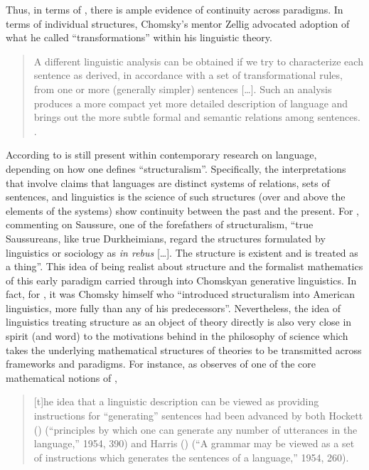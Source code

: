\documentclass[output=paper]{langscibook}
\begin{document}
Thus, in terms of , there is ample evidence of continuity across paradigms. In terms of individual structures, Chomsky's mentor Zellig \cite{Harris1951} advocated adoption of what he called ``transformations'' within his  linguistic theory. 

\begin{quote}
    A different linguistic analysis can be obtained if we try to characterize each sentence as derived, in accordance with a set of transformational rules, from one or more (generally simpler) sentences […]. Such an analysis produces a more compact yet more detailed description of language and brings out the more subtle formal and semantic relations among sentences. \citep[iv]{Harris1951}.
\end{quote}

According to \cite{Matthews2001}  is still present within contemporary research on language, depending on how one defines ``structuralism''. Specifically, the interpretations that involve claims that languages are distinct systems of relations, sets of sentences, and linguistics is the science of such structures (over and above the elements of the systems) show continuity between the past and the present. For \cite[181]{Firth1957}, commenting on Saussure, one of the forefathers of structuralism,  ``true Saussureans, like true Durkheimians, regard the structures formulated by linguistics or sociology as \emph{in rebus} […]. The structure is existent and is treated as a thing''. This idea of being realist about structure and the formalist mathematics of this early paradigm carried through into Chomskyan generative linguistics. In fact, for \cite[26]{Joseph1999}, it was Chomsky himself who ``introduced structuralism into American linguistics, more fully than any of his predecessors''. Nevertheless, the idea of linguistics treating structure as an object of theory directly is also very close in spirit (and word) to the motivations behind  in the philosophy of science which takes the underlying mathematical structures of theories to be transmitted across frameworks and paradigms. For instance, as \cite{Pullum2019} observes of one of the core mathematical notions of , 

\begin{quote}
    [t]he idea that a linguistic description can be viewed as providing instructions for ``generating'' sentences had been advanced by both Hockett (\citeyear{Hockett54}) (``principles by which one can generate any number of utterances in the language,'' 1954, 390) and Harris (\citeyear{Harris54transfer}) (``A grammar may be viewed as a set of instructions which generates the sentences of a language,'' 1954, 260). \citep{Pullum2019}
\end{quote}
\end{document}

